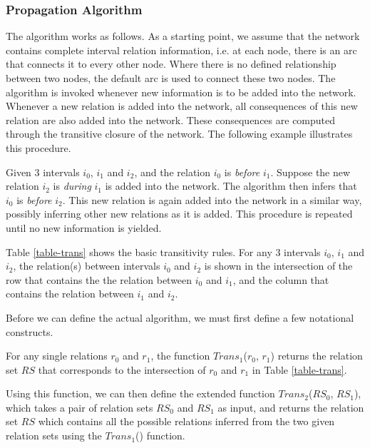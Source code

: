 \documentclass[11pt]{report}
\begin{document}
        \subsubsection{Propagation Algorithm}

          The algorithm works as follows. As a starting point, we assume that the
          network contains complete interval relation information, i.e. at each node,
          there is an arc that connects it to every other node. Where there is no
          defined relationship between two nodes, the default arc is used to connect
          these two nodes. The algorithm is invoked whenever new information is to be
          added into the network. Whenever a new relation is added into the network,
          all consequences of this new relation are also added into the network. These
          consequences are computed through the transitive closure of the network. The
          following example illustrates this procedure.

          Given 3 intervals $i_0$, $i_1$ and $i_2$, and the relation $i_0$ is
          {\em before} $i_1$. Suppose the new relation $i_2$ is {\em during} $i_1$ is
          added into the network. The algorithm then infers that $i_0$ is {\em before}
          $i_2$. This new relation is again added into the network in a similar way,
          possibly inferring other new relations as it is added. This procedure is
          repeated until no new information is yielded.

          Table \ref{table-trans} shows the basic transitivity rules. For any 3
          intervals $i_0$, $i_1$ and $i_2$, the relation(s) between intervals
          $i_0$ and $i_2$ is shown in the intersection of the row that contains the
          the relation between $i_0$ and $i_1$, and the column that contains the
          relation between $i_1$ and $i_2$.

          Before we can define the actual algorithm, we must first define a few
          notational constructs.

          For any single relations $r_0$ and $r_1$, the function $Trans_1$($r_0$, $r_1$)
          returns the relation set $RS$ that corresponds to the intersection of $r_0$
          and $r_1$ in Table \ref{table-trans}.

          Using this function, we can then define the extended function
          $Trans_2$($RS_0$, $RS_1$), which takes a pair of relation sets $RS_0$ and
          $RS_1$ as input, and returns the relation set $RS$ which contains all the
          possible relations inferred from the two given relation sets using the
          $Trans_1$() function.
\end{document}
